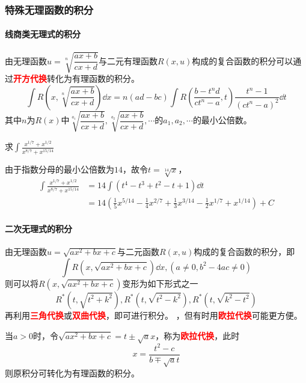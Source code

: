 \subsubsection{特殊无理函数的积分}
\paragraph{线商类无理式的积分}
由无理函数$u=\sqrt[n]{\dfrac{ax+b}{cx+d}}$与二元有理函数$R(x,u)$构成的复合函数的积分可以通过\textcolor{red}{\textbf{\textsf{开方代换}}}转化为有理函数的积分。
\[ \int R\left(x,\sqrt[n]{\frac{ax+b}{cx+d}}\right)\dd{x} = n(ad-bc)\int R\left(\frac{b-t^nd}{ct^n-a},t\right)\frac{t^n-1}{(ct^n-a)^2}\dd{t} \]
其中$n$为$R(x)$中$\sqrt[a_1]{\dfrac{ax+b}{cx+d}},\sqrt[a_2]{\dfrac{ax+b}{cx+d}},\cdots$的$a_1,a_2,\cdots$的最小公倍数。
\begin{example}
    求$\displaystyle\int\frac{x^{1/7}+x^{1/2}}{x^{8/7}+x^{15/14}}$
\end{example}
\begin{solution}
    由于指数分母的最小公倍数为$14$，故令$t=\sqrt[14]{x}$，
    \begin{align*}
        \int\frac{x^{1/7}+x^{1/2}}{x^{8/7}+x^{15/14}} & = 14\int(t^4-t^3+t^2-t+1)\dd{t}                                                                        \\
                                                      & =14(\frac{1}{5}x^{5/14} - \frac{1}{4}x^{2/7} + \frac{1}{3}x^{3/14} - \frac{1}{2}x^{1/7} + x^{1/14}) +C
    \end{align*}
\end{solution}

\paragraph{二次无理式的积分}
由无理函数$u=\sqrt{ax^2+bx+c}$与二元函数$R(x,u)$构成的复合函数的积分，即
\[ \int R(x,\sqrt{ax^2+bx+c})\dd{x}, (a\neq 0, b^2-4ac\neq 0) \]
则可以将$R(x,\sqrt{ax^2+bx+c})$变形为如下形式之一
\[ R^*(t, \sqrt{t^2+k^2}), R^*(t, \sqrt{t^2-k^2}), R^*(t, \sqrt{k^2-t^2}) \]
再利用\textcolor{red}{\textsf{\textbf{三角代换}}}或\textcolor{red}{\textsf{\textbf{双曲代换}}}，即可进行积分。
，但有时用\textcolor{red}{\textsf{\textbf{欧拉代换}}}可能更方便。

当$a>0$时，令$\sqrt{ax^2+bx+c}=t\pm\sqrt{a}x$，称为\textcolor{red}{\textsf{\textbf{欧拉代换}}}，此时
\[x=\frac{t^2-c}{b\mp\sqrt{a}t}\]
则原积分可转化为有理函数的积分。

